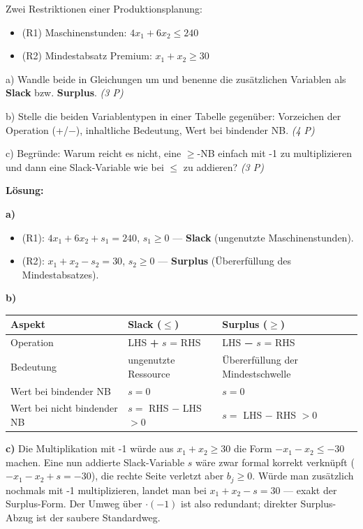 \documentclass[11pt, a4paper]{article}
\begin{document}
Zwei Restriktionen einer Produktionsplanung:


\begin{itemize}
  \item (R1) Maschinenstunden: $4x_1 + 6x_2 \leq 240$
  \item (R2) Mindestabsatz Premium: $x_1 + x_2 \geq 30$
\end{itemize}

a) Wandle beide in Gleichungen um und benenne die zusätzlichen Variablen als \textbf{Slack} bzw. \textbf{Surplus}. \textit{(3 P)}

b) Stelle die beiden Variablentypen in einer Tabelle gegenüber: Vorzeichen der Operation (+/−), inhaltliche Bedeutung, Wert bei bindender NB. \textit{(4 P)}

c) Begründe: Warum reicht es nicht, eine $\geq$-NB einfach mit -1 zu multiplizieren und dann eine Slack-Variable wie bei $\leq$ zu addieren? \textit{(3 P)}


\textbf{Lösung:}


\textbf{a)}

\begin{itemize}
  \item (R1): $4x_1 + 6x_2 + s_1 = 240$, $s_1 \geq 0$ — \textbf{Slack} (ungenutzte Maschinenstunden).
  \item (R2): $x_1 + x_2 - s_2 = 30$, $s_2 \geq 0$ — \textbf{Surplus} (Übererfüllung des Mindestabsatzes).
\end{itemize}

\textbf{b)}



{\small
\begin{tabularx}{\linewidth}{XXX}
\hline
\rowcolor{tableheadbg}
{\color{white}\textbf{Aspekt}} & {\color{white}\textbf{Slack ($\leq$)}} & {\color{white}\textbf{Surplus ($\geq$)}} \\[2pt]
\hline
\endhead
\hline
\endfoot
Operation & LHS \textbf{+} $s$ = RHS & LHS \textbf{−} $s$ = RHS \\
Bedeutung & ungenutzte Ressource & Übererfüllung der Mindestschwelle \\
Wert bei bindender NB & $s = 0$ & $s = 0$ \\
Wert bei nicht bindender NB & $s = $ RHS − LHS $> 0$ & $s = $ LHS − RHS $> 0$ \\
\end{tabularx}
}


\textbf{c)} Die Multiplikation mit -1 würde aus $x_1 + x_2 \geq 30$ die Form $-x_1 - x_2 \leq -30$ machen. Eine nun addierte Slack-Variable $s$ wäre zwar formal korrekt verknüpft ($-x_1 - x_2 + s = -30$), die rechte Seite verletzt aber $b_j \geq 0$. Würde man zusätzlich nochmals mit -1 multiplizieren, landet man bei $x_1 + x_2 - s = 30$ — exakt der Surplus-Form. Der Umweg über $\cdot(-1)$ ist also redundant; direkter Surplus-Abzug ist der saubere Standardweg.
\end{document}
